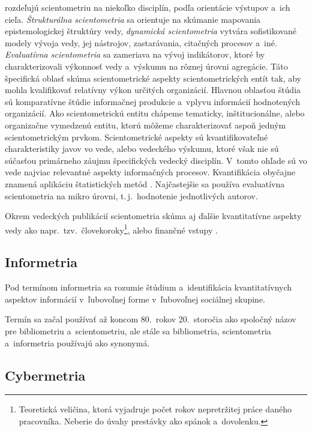 \citet{Glanzel2004} rozdeľujú scientometriu na niekoľko disciplín, podľa
orientácie výstupov a~ich cieľa.  \emph{Štrukturálna scientometria} sa orientuje
na skúmanie mapovania epistemologickej štruktúry vedy, \emph{dynamická
  scientometria} vytvára sofistikované modely vývoja vedy, jej nástrojov,
zastarávania, citačných procesov a~iné.  \emph{Evaluatívna scientometria} sa
zameriava na vývoj indikátorov, ktoré by charakterizovali výkonnosť vedy
a~výskumu na rôznej úrovni agregácie.  Táto špecifická oblasť skúma
scientometrické aspekty scientometrických entít tak, aby mohla kvalifikovať
relatívny výkon určitých organizácií.  Hlavnou oblasťou štúdia sú komparatívne
štúdie informačnej produkcie a~vplyvu informácií hodnotených organizácií.  Ako
scientometrickú entitu chápeme tematicky, inštitucionálne, alebo organizačne
vymedzenú entitu, ktorú môžeme charakterizovať aspoň jedným scientometrickým
prvkom.  Scientometrické aspekty sú kvantifikovateľné charakteristiky javov vo
vede, alebo vedeckého výskumu, ktoré však nie sú súčasťou primárneho záujmu
špecifických vedecký disciplín.  V~tomto ohľade sú vo vede najviac relevantné
aspekty informačných procesov.  Kvantifikácia obyčajne znamená aplikáciu
štatistických metód \citep{Vinkler2001}.  Najčastejšie sa používa evaluatívna
scientometria na mikro úrovni, t.\,j.~hodnotenie jednotlivých autorov.

Okrem vedeckých publikácií scientometria skúma aj ďalšie kvantitatívne aspekty
vedy ako napr.~tzv.~človekoroky\footnote{Teoretická veličina, ktorá vyjadruje
  počet rokov nepretržitej práce daného pracovníka.  Neberie do úvahy prestávky
  ako spánok a~dovolenku.}, alebo finančné vstupy \citep{Bellis2009}.


\subsection{Informetria}

Pod termínom informetria sa rozumie štúdium a~identifikácia kvantitatívnych
aspektov informácií v~ľubovoľnej forme v~ľubovoľnej sociálnej skupine.

Termín sa začal používať až koncom 80.~rokov 20.~storočia ako spoločný názov
pre bibliometriu a~scientometriu, ale stále sa bibliometria, scientometria
a~informetria používajú ako synonymá.


\subsection{Cybermetria}

